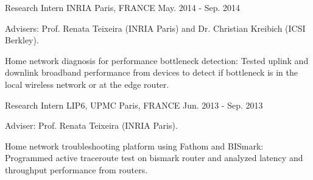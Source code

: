 \begin{cventries}
{\begin{cvitems}
      \end{cvitems}
    }

  \cventry
    {Research Intern} %
    {INRIA} %
    {Paris, FRANCE} %
    {May. 2014 - Sep. 2014} %
    {
      \begin{cvitems} %
      \item {Advisers: Prof. Renata Teixeira (INRIA Paris) and Dr. Christian Kreibich (ICSI Berkley).}
%      
      \item {Home network diagnosis for performance bottleneck detection: Tested uplink and downlink broadband performance from devices to detect if bottleneck is in the local wireless network or at the edge router.}
%      
      \end{cvitems}
    }
    
  \cventry
    {Research Intern} %
    {LIP6, UPMC} %
    {Paris, FRANCE} %
    {Jun. 2013 - Sep. 2013} %
    {
      \begin{cvitems} %
      \item {Adviser: Prof. Renata Teixeira (INRIA Paris).}
%      
      \item {Home network troubleshooting platform using Fathom and BISmark: Programmed active traceroute test on bismark router and analyzed latency and throughput performance from routers.}
%      
      \end{cvitems}
    }


\end{cventries}

